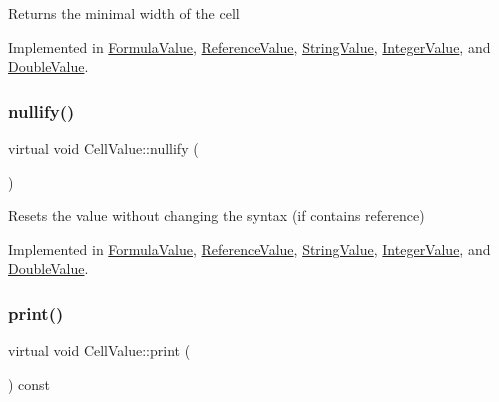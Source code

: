 Returns the minimal width of the cell 

Implemented in \hyperlink{classFormulaValue_a13abe74f12b5b201620d09e50237b195}{Formula\+Value}, \hyperlink{classReferenceValue_a5d4898e7695e098c1e6b26dfdcddbac2}{Reference\+Value}, \hyperlink{classStringValue_a4c411db1254d987504a6014e296dd565}{String\+Value}, \hyperlink{classIntegerValue_ac16c4b202cc48d96e9b1aa0137be7239}{Integer\+Value}, and \hyperlink{classDoubleValue_a4b809052b3a6239196e344fac3119c09}{Double\+Value}.

\mbox{\label{classCellValue_af4f30a4b36e159f2f2bfc7ed83f1b37a}} 
\subsubsection{\texorpdfstring{nullify()}{nullify()}}
{\footnotesize\ttfamily virtual void Cell\+Value\+::nullify (\begin{DoxyParamCaption}{ }\end{DoxyParamCaption})\hspace{0.3cm}{\ttfamily [pure virtual]}}

Resets the value without changing the syntax (if contains reference) 

Implemented in \hyperlink{classFormulaValue_a43f76e805f909e32823cf44d4d1c6cb8}{Formula\+Value}, \hyperlink{classReferenceValue_ad8d2f9ed510ea8d0c5076089dd52c998}{Reference\+Value}, \hyperlink{classStringValue_a949dd5939db253c347ce8936b0c5f368}{String\+Value}, \hyperlink{classIntegerValue_a6232180f3447a08a204612dfa9543631}{Integer\+Value}, and \hyperlink{classDoubleValue_a9a558315ff92a14907c4936ecdee9f5f}{Double\+Value}.

\mbox{\label{classCellValue_a12d1cf68a5ba83f0c375441729772742}} 
\subsubsection{\texorpdfstring{print()}{print()}}
{\footnotesize\ttfamily virtual void Cell\+Value\+::print (\begin{DoxyParamCaption}{ }\end{DoxyParamCaption}) const\hspace{0.3cm}{\ttfamily [pure virtual]}}

